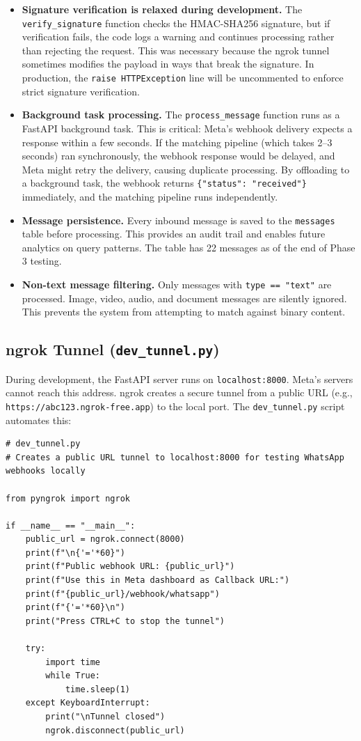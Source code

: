 \documentclass[12pt, a4paper]{report}
\begin{document}
\begin{itemize}[itemsep=4pt]
    \item \textbf{Signature verification is relaxed during development.} The \texttt{verify\_signature} function checks the HMAC-SHA256 signature, but if verification fails, the code logs a warning and continues processing rather than rejecting the request. This was necessary because the ngrok tunnel sometimes modifies the payload in ways that break the signature. In production, the \texttt{raise HTTPException} line will be uncommented to enforce strict signature verification.
    \item \textbf{Background task processing.} The \texttt{process\_message} function runs as a FastAPI background task. This is critical: Meta's webhook delivery expects a response within a few seconds. If the matching pipeline (which takes 2--3 seconds) ran synchronously, the webhook response would be delayed, and Meta might retry the delivery, causing duplicate processing. By offloading to a background task, the webhook returns \texttt{\{"status": "received"\}} immediately, and the matching pipeline runs independently.
    \item \textbf{Message persistence.} Every inbound message is saved to the \texttt{messages} table before processing. This provides an audit trail and enables future analytics on query patterns. The table has 22 messages as of the end of Phase 3 testing.
    \item \textbf{Non-text message filtering.} Only messages with \texttt{type == "text"} are processed. Image, video, audio, and document messages are silently ignored. This prevents the system from attempting to match against binary content.
\end{itemize}

\subsection{ngrok Tunnel (\texttt{dev\_tunnel.py})}

During development, the FastAPI server runs on \texttt{localhost:8000}. Meta's servers cannot reach this address. ngrok creates a secure tunnel from a public URL (e.g., \texttt{https://abc123.ngrok-free.app}) to the local port. The \texttt{dev\_tunnel.py} script automates this:

\begin{lstlisting}[style=pythonstyle, caption={ngrok Tunnel Launcher}]
# dev_tunnel.py
# Creates a public URL tunnel to localhost:8000 for testing WhatsApp webhooks locally

from pyngrok import ngrok

if __name__ == "__main__":
    public_url = ngrok.connect(8000)
    print(f"\n{'='*60}")
    print(f"Public webhook URL: {public_url}")
    print(f"Use this in Meta dashboard as Callback URL:")
    print(f"{public_url}/webhook/whatsapp")
    print(f"{'='*60}\n")
    print("Press CTRL+C to stop the tunnel")

    try:
        import time
        while True:
            time.sleep(1)
    except KeyboardInterrupt:
        print("\nTunnel closed")
        ngrok.disconnect(public_url)
\end{lstlisting}
\end{document}

